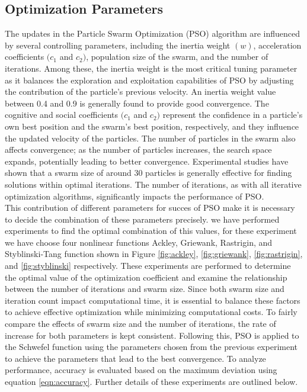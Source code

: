 \documentclass[paper,revised]{geophysics}
\begin{document}
\subsection{Optimization Parameters}
The updates in the Particle Swarm Optimization (PSO) algorithm are influenced by several controlling parameters, including the inertia weight \((w)\), acceleration coefficients \((c_1\) and \(c_2)\), population size of the swarm, and the number of iterations. Among these, the inertia weight is the most critical tuning parameter as it balances the exploration and exploitation capabilities of PSO by adjusting the contribution of the particle's previous velocity. An inertia weight value between 0.4 and 0.9 is generally found to provide good convergence. The cognitive and social coefficients \((c_1\) and \(c_2)\) represent the confidence in a particle's own best position and the swarm's best position, respectively, and they influence the updated velocity of the particles. The number of particles in the swarm also affects convergence; as the number of particles increases, the search space expands, potentially leading to better convergence. Experimental studies have shown that a swarm size of around 30 particles is generally effective for finding solutions within optimal iterations. The number of iterations, as with all iterative optimization algorithms, significantly impacts the performance of PSO.
\\
This contribution of different parameters for succes of PSO make it is necessary to decide the combination of these parameters precisely. we have performed experiments to find the optimal combination of this values, for these experiment we have choose four nonlinear functions Ackley, Griewank, Rastrigin, and Styblinski-Tang function shown in Figure \ref{fig:ackley}, \ref{fig:griewank}, \ref{fig:rastrigin}, and \ref{fig:styblinski} respectively. These experiments are performed to determine the optimal value of the optimization coefficient and examine the relationship between the number of iterations and swarm size. Since both swarm size and iteration count impact computational time, it is essential to balance these factors to achieve effective optimization while minimizing computational costs. To fairly compare the effects of swarm size and the number of iterations, the rate of increase for both parameters is kept consistent. Following this, PSO is applied to the Schwefel function using the parameters chosen from the previous experiment to achieve the parameters that lead to the best convergence. To analyze performance, accuracy is evaluated based on the maximum deviation using equation \ref{eqn:accuracy}. Further details of these experiments are outlined below.
\end{document}
